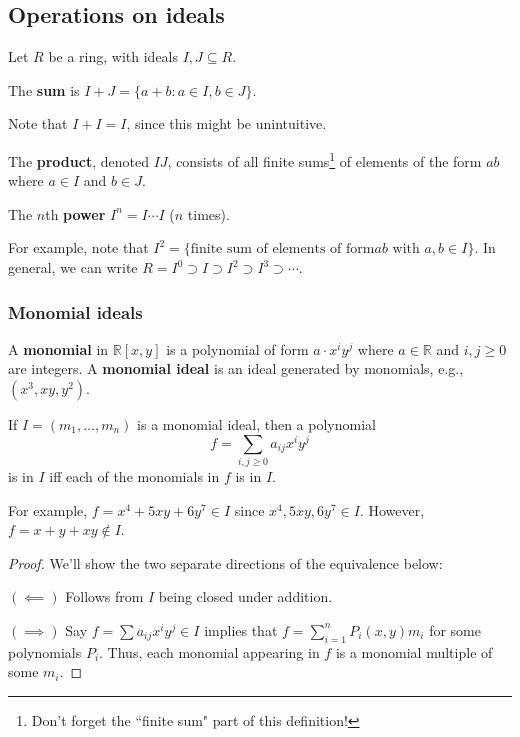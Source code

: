 \documentclass{article}
\theoremstyle{plain}
\newcommand{\R}{\mathbb{R}}
\newcounter{examplecounter}
\renewcommand{\theexamplecounter}{\arabic{examplecounter}}
\newenvironment{example}[1]{%
\vspace{-0.35cm}
\rule{\linewidth}{0.1mm}

\refstepcounter{examplecounter}%
\noindent\textbf{Example~\theexamplecounter}:}
{\\[0.01in]\rule{\linewidth}{0.1mm}}
\begin{document}
\subsection{Operations on ideals}
Let $R$ be a ring, with ideals $I,J \subseteq R$.
\begin{definition}{}{}
The \textbf{sum} is $I+J = \{ a+b : a\in I, b\in J \}$.
\end{definition}

Note that $I + I = I$, since this might be unintuitive.

\begin{definition}{}{}
The \textbf{product}, denoted $IJ$, consists of all finite sums\footnote{Don't forget the ``finite sum" part of this definition!} of elements of the form $ab$ where  $a\in I$ and  $b\in J$.
\end{definition}

\begin{definition}{}{}
The $n$th \textbf{power} $I^n = I\cdots I$ ($n$ times).
\end{definition}

For example, note that $I^2 = \{ \text{finite sum of elements of form} ab \text{ with } a,b\in I \}$. In general, we can write $R = I^0 \supset I \supset I^2 \supset I^3 \supset\cdots$.

\subsubsection{Monomial ideals}
\begin{definition}{}{}
A \textbf{monomial} in $\R[x,y]$ is a polynomial of form $a\cdot x^iy^j$ where $a \in \R$ and $i,j \ge 0$ are integers. A \textbf{monomial ideal} is an ideal generated by monomials, e.g., $(x^3, xy, y^2)$.
\end{definition}
\begin{lemma}{}{}
If $I = (m_1,\ldots,m_n)$ is a monomial ideal, then a polynomial
$$f = \sum_{i,j \ge 0} a_{ij}x^iy^j$$
is in $I$ iff each of the monomials in $f$ is in $I$.
\end{lemma}
For example, $f = x^4 + 5xy + 6y^7 \in I$ since $x^4,5xy,6y^7 \in I$. However, $f = x + y + xy \not\in I$.
\begin{proof}
We'll show the two separate directions of the equivalence below:

$(\impliedby)$ Follows from $I$ being closed under addition.

$(\implies)$ Say $f = \sum a_{ij}x^iy^j \in I$ implies that $f = \sum_{i=1}^n P_i(x,y)m_i$ for some polynomials $P_i$. Thus, each monomial appearing in $f$ is a monomial multiple of some $m_i$.
\end{proof}
\vspace{0.5cm}
\end{document}
